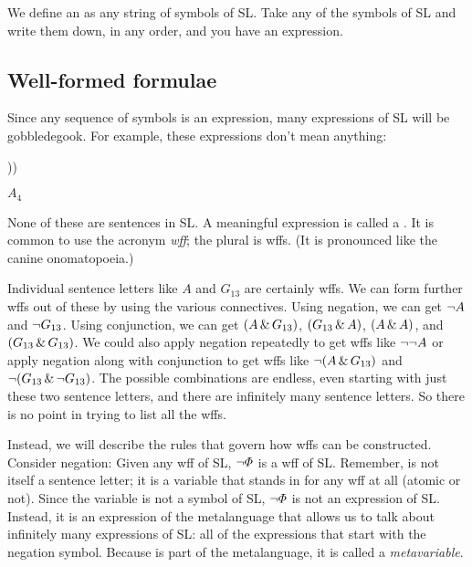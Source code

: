 We define an  as any string of symbols of SL. Take any of the symbols of SL and write them down, in any order, and you have an expression.


\subsection{Well-formed formulae}

Since any sequence of symbols is an expression, many expressions of SL will be gobbledegook. For example, these expressions don't mean anything:

\begin{earg}
\item[] \enot\enot\enot\enot
\item[] ))\eiff
\item[] $A_4$ \eor
\end{earg}

None of these are sentences in SL. A meaningful expression is called a . It is common to use the acronym \emph{wff}; the plural is wffs. (It is pronounced like the canine onomatopoeia.)

Individual sentence letters like $A$ and $G_{13}$ are certainly wffs. We can form further wffs out of these by using the various connectives. Using negation, we can get $\neg A$ and $\neg G_{13}$. Using conjunction, we can get $(A \,\&\, G_{13})$, $(G_{13} \,\&\, A)$, $(A \,\&\, A)$, and $(G_{13} \,\&\, G_{13})$. We could also apply negation repeatedly to get wffs like $\neg \neg A$ or apply negation along with conjunction to get wffs like $\neg(A \,\&\, G_{13})$ and $\neg(G_{13} \,\&\, \neg G_{13})$. The possible combinations are endless, even starting with just these two sentence letters, and there are infinitely many sentence letters. So there is no point in trying to list all the wffs.

Instead, we will describe the rules that govern how wffs can be constructed. Consider negation: Given any wff \metaA{} of SL, $\neg\varPhi{}$ is a wff of SL. Remember, \metaA{} is not itself a sentence letter; it is a variable that stands in for any wff at all (atomic or not). Since the variable \metaA{} is not a symbol of SL, $\neg\varPhi{}$ is not an expression of SL. Instead, it is an expression of the metalanguage that allows us to talk about infinitely many expressions of SL: all of the expressions that start with the negation symbol. Because \metaA{} is part of the metalanguage, it is called a \emph{metavariable}.


